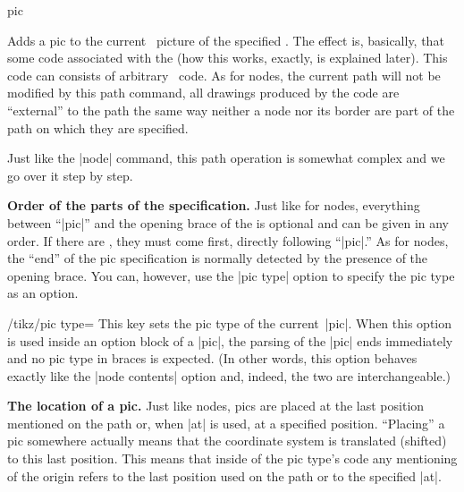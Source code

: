 \begin{pathoperation}{pic}{%
    }
  
  Adds a pic to the current \tikzname\ picture of the specified
  . The effect is, basically, that some code associated
  with the  (how this works, exactly, is explained
  later). This code can consists of arbitrary \tikzname\ code. As for
  nodes, the current path will not be modified by this path command,
  all drawings produced by the code are ``external'' to the path the
  same way neither a node nor its border are part of the path on which
  they are specified. 
  
  Just like the |node| command, this path operation is somewhat
  complex and we go over it step by step.

  \medskip
  \textbf{Order of the parts of the specification.}
  Just like for nodes, everything between ``|pic|'' and the opening
  brace of the  is optional and can be given in any
  order. If there are , they must come
  first, directly following ``|pic|.'' As for nodes, the ``end'' of
  the pic specification is normally detected by the presence of the
  opening brace. You can, however, use the |pic type|
  option to specify the pic type as an option.
  
  \begin{key}{/tikz/pic type=}
    This key sets the pic type of the current~|pic|. When this option
    is used inside an option block of a |pic|, the parsing of the
    |pic| ends immediately and no pic type in braces is expected. (In
    other words, this option behaves exactly like the |node contents|
    option and, indeed, the two are interchangeable.) 
\begin{codeexample}[]
\end{codeexample}
  \end{key}

  \medskip
  \textbf{The location of a pic.}
  Just like nodes, pics are placed at the last position mentioned on
  the path or, when |at| is used, at a specified position. ``Placing''
  a pic somewhere actually means that the coordinate system is
  translated (shifted) to this last position. This means that inside
  of the pic type's code any mentioning of the origin refers to the
  last position used on the path or to the specified |at|.


\end{pathoperation}
